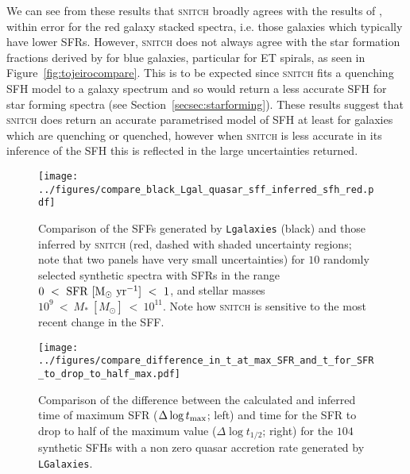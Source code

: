 \documentclass[useAMS,usenatbib]{mn2e}
\begin{document}
We can see from these results that \textsc{snitch} broadly agrees with the results of \citeauthor{tojeiro13}, within error for the red galaxy stacked spectra, i.e. those galaxies which typically have lower SFRs. However, \textsc{snitch} does not always agree with the star formation fractions derived by \cite{tojeiro13} for blue galaxies, particular for ET spirals, as seen in Figure~\ref{fig:tojeirocompare}. This is to be expected since \textsc{snitch} fits a quenching SFH model to a galaxy spectrum and so would return a less accurate SFH for star forming spectra (see Section~\ref{secsec:starforming}). These results suggest that \textsc{snitch} does return an accurate parametrised model of SFH at least for galaxies which are quenching or quenched, however when \textsc{snitch} is less accurate in its inference of the SFH this is reflected in the large uncertainties returned.   

\begin{figure}
\centering
\texttt{[image: ../figures/compare\_black\_Lgal\_quasar\_sff\_inferred\_sfh\_red.pdf]}
\caption{Comparison of the SFFs generated by \texttt{Lgalaxies} (black) and those inferred by \textsc{snitch} (red, dashed with shaded uncertainty regions; note that two panels have very small uncertainties) for $10$ randomly selected synthetic spectra with SFRs in the range $0~<~\rm{SFR}~[M_{\odot}~\rm{yr}^{-1}]~<~1$, and stellar masses $10^9~<~M_{*}~[M_{\odot}]~<~10^{11}$. Note how \textsc{snitch} is sensitive to the most recent change in the SFF.}
\label{fig:lgalsfhs}
\end{figure}

\begin{figure}
\centering
\texttt{[image: ../figures/compare\_difference\_in\_t\_at\_max\_SFR\_and\_t\_for\_SFR\_to\_drop\_to\_half\_max.pdf]}
\caption{Comparison of the difference between the calculated and inferred time of maximum SFR ($\Delta \log t_{\rm{max}}$; left) and time for the SFR to drop to half of the maximum value ($\Delta \log t_{1/2}$; right) for the $104$ synthetic SFHs with a non zero quasar accretion rate generated by \texttt{LGalaxies}.}
\label{fig:genlgalsfhs}
\end{figure}



\end{document}
